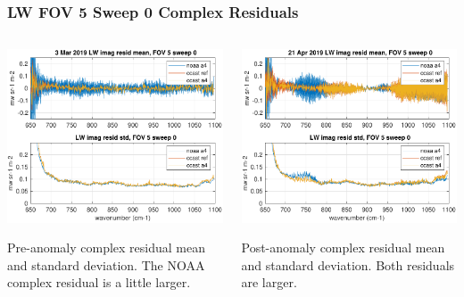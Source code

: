 \documentclass[10pt]{beamer}
\begin{document}
\begin{frame}
\frametitle{LW FOV 5 Sweep 0 Complex Residuals}
\begin{columns}[t]
\begin{column}{0.5\textwidth}
  \begin{centering}
  \includegraphics[width=\textwidth]{figures/LW_MW_good_imag_fov5_sd0.pdf}
  \end{centering}\vspace{3mm}
  Pre-anomaly complex residual mean and standard deviation.  The NOAA complex
  residual is a little larger.

\end{column}
\begin{column}{0.5\textwidth}  
  \begin{centering}
  \includegraphics[width=\textwidth]{figures/LW_MW_fail_imag_fov5_sd0.pdf}
  \end{centering}\vspace{3mm}
  Post-anomaly complex residual mean and standard deviation.  Both residuals are
  larger.

\end{column}
\end{columns}
\end{frame}
\end{document}
